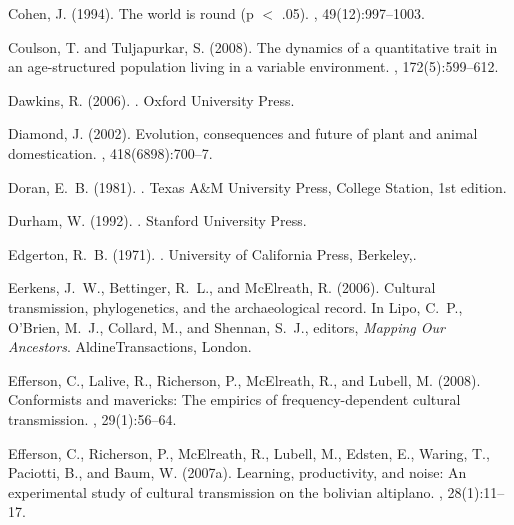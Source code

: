 Cohen, J. (1994).
\newblock The world is round (p $<$ .05).
, 49(12):997--1003.

Coulson, T. and Tuljapurkar, S. (2008).
\newblock The dynamics of a quantitative trait in an age-structured population
  living in a variable environment.
, 172(5):599--612.

Dawkins, R. (2006).
.
\newblock Oxford University Press.

Diamond, J. (2002).
\newblock Evolution, consequences and future of plant and animal domestication.
, 418(6898):700--7.

Doran, E.~B. (1981).
.
\newblock Texas A\&M University Press, College Station, 1st edition.

Durham, W. (1992).
.
\newblock Stanford University Press.

Edgerton, R.~B. (1971).
.
\newblock University of California Press, Berkeley,.

Eerkens, J.~W., Bettinger, R.~L., and McElreath, R. (2006).
\newblock Cultural transmission, phylogenetics, and the archaeological record.
\newblock In Lipo, C.~P., O'Brien, M.~J., Collard, M., and Shennan, S.~J.,
  editors, {\em Mapping Our Ancestors}. AldineTransactions, London.

Efferson, C., Lalive, R., Richerson, P., McElreath, R., and Lubell, M. (2008).
\newblock Conformists and mavericks: The empirics of frequency-dependent
  cultural transmission.
, 29(1):56--64.

Efferson, C., Richerson, P., McElreath, R., Lubell, M., Edsten, E., Waring, T.,
  Paciotti, B., and Baum, W. (2007a).
\newblock Learning, productivity, and noise: An experimental study of cultural
  transmission on the bolivian altiplano.
, 28(1):11--17.

